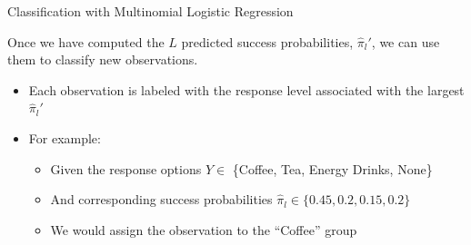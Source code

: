 \documentclass{beamer}\usepackage[]{graphicx}\usepackage[]{color}
\begin{document}

\begin{frame}{Classification with Multinomial Logistic Regression}
  
  Once we have computed the $L$ predicted success probabilities, $\hat{\pi}_l'$, 
  we can use them to classify new observations.
  \vb
  \begin{itemize}
  \item Each observation is labeled with the response level associated with the 
    largest $\hat{\pi}_l'$
    \vb
  \item For example:
    \vb
    \begin{itemize}
    \item Given the response options $Y \in $
      \{Coffee, Tea, Energy Drinks, None\}
      \vb
    \item And corresponding success probabilities $\hat{\pi}_l \in 
      \{0.45, 0.2, 0.15, 0.2\}$
      \vb
    \item We would assign the observation to the ``Coffee'' group 
    \end{itemize}
  \end{itemize}

\end{frame}

\end{document}
